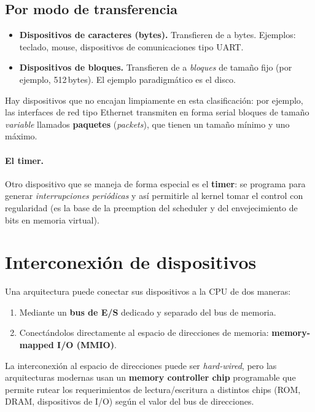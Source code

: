 \documentclass[11pt,a4paper]{article}
\begin{document}
\subsection{Por modo de transferencia}

\begin{itemize}[leftmargin=*]
    \item \textbf{Dispositivos de caracteres (bytes).} Transfieren de a
        bytes. Ejemplos: teclado, mouse, dispositivos de
        comunicaciones tipo UART.
    \item \textbf{Dispositivos de bloques.} Transfieren de a
        \emph{bloques} de tamaño fijo (por ejemplo, 512\,bytes). El
        ejemplo paradigmático es el disco.
\end{itemize}

Hay dispositivos que no encajan limpiamente en esta clasificación: por
ejemplo, las interfaces de red tipo Ethernet transmiten en forma
serial bloques de tamaño \emph{variable} llamados \textbf{paquetes}
(\emph{packets}), que tienen un tamaño mínimo y uno máximo.

\paragraph{El timer.}
Otro dispositivo que se maneja de forma especial es el \textbf{timer}:
se programa para generar \emph{interrupciones periódicas} y así
permitirle al kernel tomar el control con regularidad (es la base de
la preemption del scheduler y del envejecimiento de bits en memoria
virtual).

\section{Interconexión de dispositivos}

Una arquitectura puede conectar sus dispositivos a la CPU de dos
maneras:

\begin{enumerate}[leftmargin=*]
    \item Mediante un \textbf{bus de E/S} dedicado y separado del bus
        de memoria.
    \item Conectándolos directamente al espacio de direcciones de
        memoria: \textbf{memory-mapped I/O (MMIO)}.
\end{enumerate}

La interconexión al espacio de direcciones puede ser \emph{hard-wired},
pero las arquitecturas modernas usan un \textbf{memory controller chip}
programable que permite rutear los requerimientos de lectura/escritura
a distintos chips (ROM, DRAM, dispositivos de I/O) según el valor del
bus de direcciones.
\end{document}

